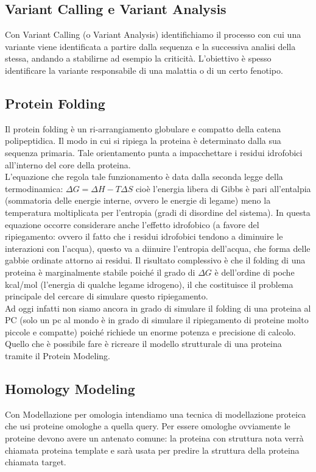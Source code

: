 \documentclass{article}
\begin{document}
\subsection*{Variant Calling e Variant Analysis}
Con Variant Calling (o Variant Analysis) identifichiamo il processo con cui una variante viene identificata a partire dalla sequenza e la successiva analisi della stessa, andando a stabilirne ad esempio la criticità. L'obiettivo è spesso identificare la variante responsabile di una malattia o di un certo fenotipo.


\subsection*{Protein Folding}
Il protein folding è un ri-arrangiamento globulare e compatto della catena polipeptidica. Il modo in cui si ripiega la proteina è determinato dalla sua sequenza primaria. Tale orientamento punta a impacchettare i residui idrofobici all'interno del core della proteina.\\
L'equazione che regola tale funzionamento è data dalla seconda legge della termodinamica: $ \Delta G = \Delta H - T \Delta S $ cioè l'energia libera di Gibbs è pari all'entalpia (sommatoria delle energie interne, ovvero le energie di legame) meno la temperatura moltiplicata per l'entropia
(gradi di disordine del sistema). In questa equazione occorre considerare anche l'effetto idrofobico (a favore del ripiegamento: ovvero il fatto che i residui idrofobici tendono a diminuire le interazioni con l'acqua), questo va a diinuire l'entropia dell'acqua, che forma delle gabbie ordinate attorno ai residui. Il risultato
complessivo è che il folding di una proteina è marginalmente stabile poiché il grado di $\Delta G$ è dell'ordine di poche kcal/mol (l'energia di qualche legame idrogeno), il che costituisce il problema principale del cercare di simulare questo ripiegamento.\\
Ad oggi infatti non siamo ancora in grado di simulare il folding di una proteina al PC (solo un pc al mondo è in grado di simulare il ripiegamento di proteine molto piccole e compatte) poiché richiede un enorme potenza e precisione di calcolo. Quello che è possibile fare è ricreare il modello strutturale di una proteina tramite il Protein Modeling.

\subsection*{Homology Modeling}
Con Modellazione per omologia intendiamo una tecnica di modellazione proteica che usi proteine omologhe a quella query. Per essere omologhe ovviamente le proteine devono avere un antenato comune: la proteina con struttura nota verrà chiamata proteina template e sarà usata
per predire la struttura della proteina chiamata target. 
\end{document}
